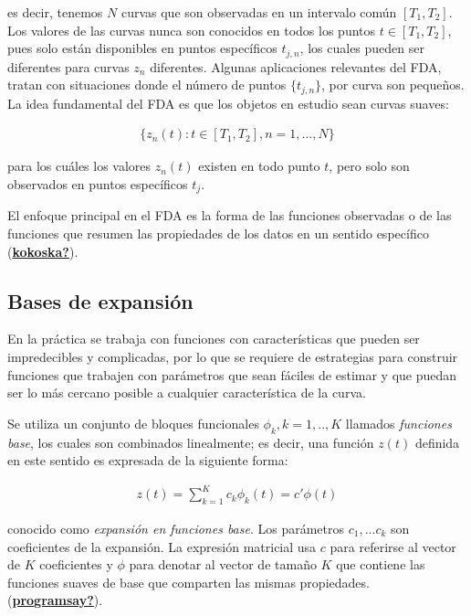 \documentclass[
]{book}
\begin{document}
es decir, tenemos \(N\) curvas que son observadas en un intervalo común \([T_1,T_2]\). Los valores de las curvas nunca son conocidos en todos los puntos \(t\in[T_1,T_2]\), pues solo están disponibles en puntos específicos \(t_{j,n}\), los cuales pueden ser diferentes para curvas \(z_n\) diferentes. Algunas aplicaciones relevantes del FDA, tratan con situaciones donde el número de puntos \(\{t_{j,n}\}\), por curva son pequeños. La idea fundamental del FDA es que los objetos en estudio sean curvas suaves:

\begin{align}
    \{z_n(t):t\in[T_1,T_2],n=1,...,N\}
\end{align}

para los cuáles los valores \(z_n(t)\) existen en todo punto \(t\), pero solo son observados en puntos específicos \(t_j\).

El enfoque principal en el FDA es la forma de las funciones observadas o de las funciones que resumen las propiedades de los datos en un sentido específico (\protect\hyperlink{ref-kokoska}{\textbf{kokoska?}}).

\hypertarget{bases-de-expansiuxf3n}{%
\subsection*{Bases de expansión}\label{bases-de-expansiuxf3n}}

En la práctica se trabaja con funciones con características que pueden ser impredecibles y complicadas, por lo que se requiere de estrategias para construir funciones que trabajen con parámetros que sean fáciles de estimar y que puedan ser lo más cercano posible a cualquier característica de la curva.

Se utiliza un conjunto de bloques funcionales \(\phi_k,k=1,..,K\) llamados \emph{funciones base}, los cuales son combinados linealmente; es decir, una función \(z(t)\) definida en este sentido es expresada de la siguiente forma:

\begin{align}
    z(t)=\sum_{k=1}^Kc_k\phi_k(t)=c'\phi(t)
\end{align}

conocido como \emph{expansión en funciones base}. Los parámetros \(c_1,...c_k\) son coeficientes de la expansión. La expresión matricial usa \(c\) para referirse al vector de \(K\) coeficientes y \(\phi\) para denotar al vector de tamaño \(K\) que contiene las funciones suaves de base que comparten las mismas propiedades. (\protect\hyperlink{ref-programsay}{\textbf{programsay?}}).
\end{document}
